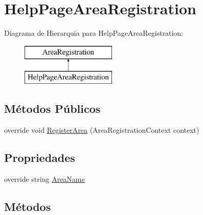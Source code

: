 \hypertarget{classApi3Layers_1_1Areas_1_1HelpPage_1_1HelpPageAreaRegistration}{}\section{Help\+Page\+Area\+Registration}
\label{classApi3Layers_1_1Areas_1_1HelpPage_1_1HelpPageAreaRegistration}
Diagrama de Hierarquia para Help\+Page\+Area\+Registration\+:\begin{figure}[H]
\begin{center}
\leavevmode
\includegraphics[height=2.000000cm]{dd/df1/classApi3Layers_1_1Areas_1_1HelpPage_1_1HelpPageAreaRegistration}
\end{center}
\end{figure}
\subsection*{Métodos Públicos}
\begin{DoxyCompactItemize}
\item 
override void \hyperlink{classApi3Layers_1_1Areas_1_1HelpPage_1_1HelpPageAreaRegistration_a7c67c594ee2be5522d6bb422ba337e94}{Register\+Area} (Area\+Registration\+Context context)
\end{DoxyCompactItemize}
\subsection*{Propriedades}
\begin{DoxyCompactItemize}
\item 
override string \hyperlink{classApi3Layers_1_1Areas_1_1HelpPage_1_1HelpPageAreaRegistration_acf6f429626f20687e61c64d5d5dd9f6d}{Area\+Name}
\end{DoxyCompactItemize}


\subsection{Métodos}
\mbox{\label{classApi3Layers_1_1Areas_1_1HelpPage_1_1HelpPageAreaRegistration_a7c67c594ee2be5522d6bb422ba337e94}} 
